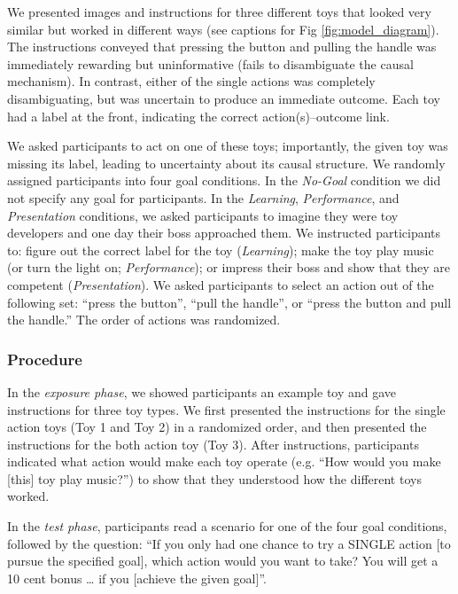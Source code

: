 \documentclass[10pt, letterpaper]{article}
\begin{document}
We presented images and instructions for three different toys that
looked very similar but worked in different ways (see captions for Fig
\ref{fig:model_diagram}). The instructions conveyed that pressing the
button and pulling the handle was immediately rewarding but
uninformative (fails to disambiguate the causal mechanism). In contrast,
either of the single actions was completely disambiguating, but was
uncertain to produce an immediate outcome. Each toy had a label at the
front, indicating the correct action(s)--outcome link.

We asked participants to act on one of these toys; importantly, the
given toy was missing its label, leading to uncertainty about its causal
structure. We randomly assigned participants into four goal conditions.
In the \emph{No-Goal} condition we did not specify any goal for
participants. In the \emph{Learning}, \emph{Performance}, and
\emph{Presentation} conditions, we asked participants to imagine they
were toy developers and one day their boss approached them. We
instructed participants to: figure out the correct label for the toy
(\emph{Learning}); make the toy play music (or turn the light on;
\emph{Performance}); or impress their boss and show that they are
competent (\emph{Presentation}). We asked participants to select an
action out of the following set: ``press the button'', ``pull the
handle'', or ``press the button and pull the handle.'' The order of
actions was randomized.

\subsubsection{Procedure}\label{procedure}

In the \emph{exposure phase}, we showed participants an example toy and
gave instructions for three toy types. We first presented the
instructions for the single action toys (Toy 1 and Toy 2) in a
randomized order, and then presented the instructions for the both
action toy (Toy 3). After instructions, participants indicated what
action would make each toy operate (e.g. ``How would you make {[}this{]}
toy play music?'') to show that they understood how the different toys
worked.

In the \emph{test phase}, participants read a scenario for one of the
four goal conditions, followed by the question: ``If you only had one
chance to try a SINGLE action {[}to pursue the specified goal{]}, which
action would you want to take? You will get a 10 cent bonus \ldots{} if
you {[}achieve the given goal{]}''.
\end{document}
